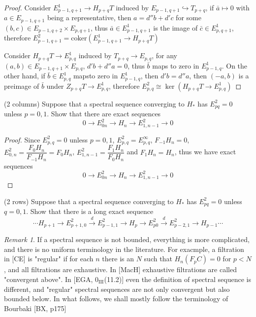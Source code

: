 \documentclass{article}
\newenvironment{exercise}[2][Exercise]{\begin{trivlist}
\item[\hskip \labelsep {\bfseries #1}\hskip \labelsep {\bfseries #2.}]}{\end{trivlist}}
\theoremstyle{definition}
\theoremstyle{remark}
\newtheorem*{remark}{Remark}
\theoremstyle{definition}
\begin{document}
\begin{proof}
Consider $E^1_{p-1,q+1}\to H_{p+q}T$ induced by $E_{p-1,q+1}\hookrightarrow T_{p+q}$, if $\bar a\mapsto0$ with $a\in E_{p-1,q+1}$ being a representative, then $a=d''b+d'c$ for some $(b,c)\in E_{p-1,q+2}\times E_{p,q+1}$, thus $\bar a\in E^1_{p-1,q+1}$ is the image of $\bar c\in E^1_{p,q+1}$, therefore $E^2_{p-1,q+1}=\mathrm{coker}(E^1_{p-1,q+1}\to H_{p+q}T)$ \par
Consider $H_{p+q}T\to E^1_{p,q}$ induced by $T_{p+q}\to E_{p,q}$, for any $(a,b)\in E_{p-1,q+1}\times E_{p,q}$, $d'b+d''a=0$, thus $\bar b$ maps to zero in $E^1_{p-1,q}$. On the other hand, if $\bar b\in E^1_{p,q}$ mapsto zero in $E^1_{p-1,q}$, then $d'b=d''a$, then $(-a,b)$ is a preimage of $\bar b$ under $Z_{p+q}T\to E^1_{p,q}$, therefore $E^2_{p,q}\cong\ker(H_{p+q}T\to E^1_{p,q})$
\end{proof}

\begin{exercise}{\textbf{5.2.1}}(2 columns)
Suppose that a spectral sequence converging to $H_*$ has $E_{pq}^2=0$ unless $p=0,1$. Show that there are exact sequences
\[0\to E^2_{0n}\to H_n\to E^2_{1,n-1}\to0\]
\end{exercise}

\begin{proof}
Since $E^2_{p,q}=0$ unless $p=0,1$, $E^2_{p,q}=E^\infty_{p,q}$, $F_{-1}H_n=0$, $E^2_{0,n}=\dfrac{F_{0}H_n}{F_{-1}H_n}=F_{0}H_n$, $E^2_{1,n-1}=\dfrac{F_{1}H_n}{F_{0}H_n}$ and $F_1H_n=H_n$, thus we have exact sequences
\[0\to E^2_{0n}\to H_n\to E^2_{1,n-1}\to0\]
\end{proof}

\begin{exercise}{\textbf{5.2.2}}(2 rows)
Suppose that a spectral sequence converging to $H_*$ has $E_{pq}^2=0$ unless $q=0,1$. Show that there is a long exact sequence
\[\cdots H_{p+1}\to E^2_{p+1,0}\xrightarrow dE^2_{p-1,1}\to H_p\to E^2_{p0}\xrightarrow dE^2_{p-2,1}\to H_{p-1}\cdots\]
\end{exercise}

\begin{remark}
If a spectral sequence is not bounded, everything is more complicated, and there is no uniform terminology in the literature. For exacmple, a filtration in [CE] is "regular" if for each $n$ there is an $N$ such that $H_n(F_pC)=0$ for $p<N$, and all filtrations are exhaustive. In [MacH] exhaustive filtrations are called "convergent above". In [EGA, $0_{\text{III}}$(11.2)] even the definition of spectral sequence is different, and "regular" spectral sequences are not only convergent but also bounded below. In what follows, we shall mostly follow the terminology of Bourbaki [BX, p175]
\end{remark}
\end{document}
